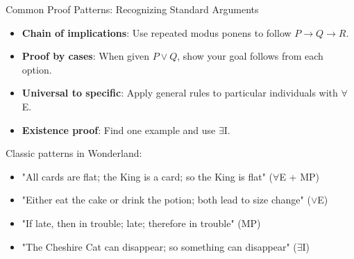 \documentclass{beamer}
\begin{document}
	\begin{frame}{Common Proof Patterns: Recognizing Standard Arguments}
		\begin{itemize}
			\item \textbf{Chain of implications}: Use repeated modus ponens to follow $P \rightarrow Q \rightarrow R$.
			\item \textbf{Proof by cases}: When given $P \lor Q$, show your goal follows from each option.
			\item \textbf{Universal to specific}: Apply general rules to particular individuals with $\forall$E.
			\item \textbf{Existence proof}: Find one example and use $\exists$I.
		\end{itemize}
		
		\begin{example}
			Classic patterns in Wonderland:
			\begin{itemize}
				\item "All cards are flat; the King is a card; so the King is flat" ($\forall$E + MP)
				\item "Either eat the cake or drink the potion; both lead to size change" ($\lor$E)
				\item "If late, then in trouble; late; therefore in trouble" (MP)
				\item "The Cheshire Cat can disappear; so something can disappear" ($\exists$I)
			\end{itemize}
		\end{example}
	\end{frame}
	
\end{document}
